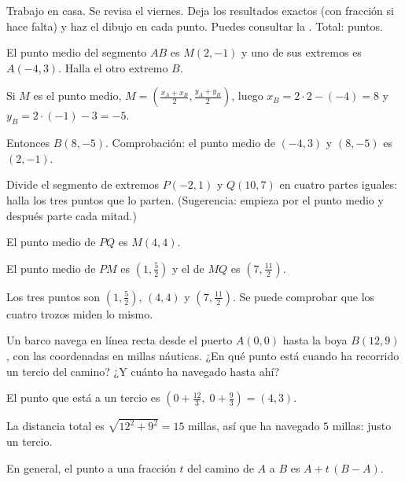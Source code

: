 \documentclass[11pt]{article}
\begin{document}
\encabezado

\begin{instrucciones}
Trabajo en casa. Se revisa el viernes. Deja los resultados exactos (con fracción si hace
falta) y haz el dibujo en cada punto. Puedes consultar la .
Total: \totalpuntos{} puntos.
\end{instrucciones}

\begin{preguntas}

\pregunta[1] El punto medio del segmento $AB$ es $M(2, -1)$ y uno de sus extremos es
$A(-4, 3)$. Halla el otro extremo $B$.
\begin{solucion}[4cm]
Si $M$ es el punto medio, $M = \left(\frac{x_A + x_B}{2}, \frac{y_A + y_B}{2}\right)$, luego
$x_B = 2 \cdot 2 - (-4) = 8$ y $y_B = 2 \cdot (-1) - 3 = -5$.

Entonces $B(8, -5)$. Comprobación: el punto medio de $(-4, 3)$ y $(8, -5)$ es $(2, -1)$.
\end{solucion}

\pregunta[1.5] Divide el segmento de extremos $P(-2, 1)$ y $Q(10, 7)$ en cuatro partes
iguales: halla los tres puntos que lo parten. (Sugerencia: empieza por el punto medio y
después parte cada mitad.)
\begin{solucion}[5cm]
El punto medio de $PQ$ es $M(4, 4)$.

El punto medio de $PM$ es $\left(1, \frac{5}{2}\right)$ y el de $MQ$ es
$\left(7, \frac{11}{2}\right)$.

Los tres puntos son $\left(1, \frac{5}{2}\right)$, $(4, 4)$ y $\left(7, \frac{11}{2}\right)$.
Se puede comprobar que los cuatro trozos miden lo mismo.
\end{solucion}

\pregunta[1.5] Un barco navega en línea recta desde el puerto $A(0, 0)$ hasta la boya
$B(12, 9)$, con las coordenadas en millas náuticas. ¿En qué punto está cuando ha recorrido un
tercio del camino? ¿Y cuánto ha navegado hasta ahí?
\begin{solucion}[5cm]
El punto que está a un tercio es
$\left(0 + \frac{12}{3},\; 0 + \frac{9}{3}\right) = (4, 3)$.

La distancia total es $\sqrt{12^2 + 9^2} = 15$ millas, así que ha navegado $5$ millas: justo un
tercio.

En general, el punto a una fracción $t$ del camino de $A$ a $B$ es $A + t\,(B - A)$.
\end{solucion}


\end{preguntas}
\end{document}
